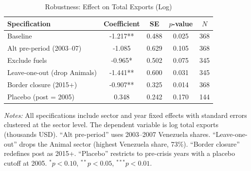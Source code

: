 \begin{table}[!htbp]
\centering
\begin{threeparttable}
\caption{Robustness: Effect on Total Exports (Log)}
\label{tab:robustness}
\small
\begin{tabular}{lcccc}
\toprule
Specification & Coefficient & SE & $p$-value & $N$ \\
\midrule
Baseline & -1.217** & 0.488 & 0.025 & 368 \\
Alt pre-period (2003--07) & -1.085 & 0.629 & 0.105 & 368 \\
Exclude fuels & -0.965* & 0.502 & 0.075 & 345 \\
Leave-one-out (drop Animals) & -1.441** & 0.600 & 0.031 & 345 \\
Border closure (2015+) & -0.907** & 0.325 & 0.014 & 368 \\
Placebo (post = 2005) & 0.348 & 0.242 & 0.170 & 144 \\
\bottomrule
\end{tabular}
\begin{tablenotes}[flushleft]\footnotesize
\item \textit{Notes:} All specifications include sector and year fixed effects with standard errors clustered at the sector level. The dependent variable is log total exports (thousands USD). ``Alt pre-period'' uses 2003--2007 Venezuela shares. ``Leave-one-out'' drops the Animal sector (highest Venezuela share, 73\%). ``Border closure'' redefines post as 2015+. ``Placebo'' restricts to pre-crisis years with a placebo cutoff at 2005. $^{*}p<0.10$, $^{**}p<0.05$, $^{***}p<0.01$.
\end{tablenotes}
\end{threeparttable}
\end{table}
